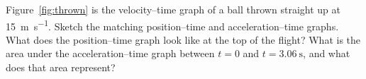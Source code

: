 \begin{checkbox}
Figure~\ref{fig:thrown} is the velocity--time graph of a ball thrown straight up at \SI{15}{\metre\per\second}. Sketch the matching position--time and acceleration--time graphs. What does the position--time graph look like at the top of the flight? What is the area under the acceleration--time graph between $t = 0$ and $t = \SI{3.06}{\second}$, and what does that area represent?
\end{checkbox}

